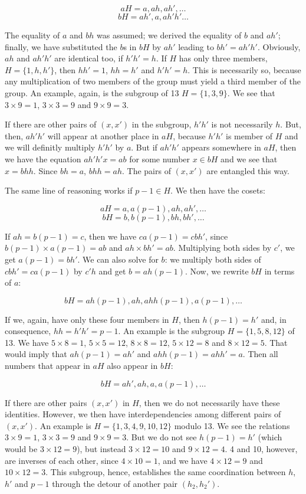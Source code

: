 \documentclass{scrreprt}
\begin{document}
{\[
aH = a, ah, ah', \dots
\]
\[
bH = ah', a, ah'h' \dots
\]

The equality of $a$ and $bh$
was assumed; we derived the equality
of $b$ and $ah'$; finally,
we have substituted the $b$s in $bH$
by $ah'$ leading to $bh' = ah'h'$.
Obviously, $ah$ and $ah'h'$
are identical too, if $h'h' = h$.
If $H$ has only three members,
$H = \lbrace 1, h, h'\rbrace$,
then $hh' = 1$, $hh = h'$
and $h'h' = h$.
This is necessarily so, because
any multiplication of two members
of the group must yield a third
member of the group.
An example, again, is the subgroup of 13
$H = \lbrace 1,3,9\rbrace$.
We see that $3 \times 9 = 1$,
$3 \times 3 = 9$ and $9 \times 9 = 3$.

If there are other pairs of $(x,x')$
in the subgroup, $h'h'$ is not necessarily
$h$. But, then, $ah'h'$ will appear at another place
in $aH$, because $h'h'$ is member of $H$
and we will definitly multiply $h'h'$ by $a$.
But if $ah'h'$ appears somewhere
in $aH$, then we have the equation
$ah'h'x = ab$ for some number $x \in bH$
and we see that $x = bhh$. 
Since $bh = a$, $bhh = ah$. 
The pairs of $(x,x')$ are entangled this way.

The same line of reasoning works 
if $p-1 \in H$. We then have the cosets:

\[
aH = a, a(p-1), ah, ah', \dots
\]
\[
bH = b, b(p-1), bh, bh', \dots
\]

If $ah = b(p-1) = c$, then we have
$ca(p-1) = cbh'$, since 
$b(p-1) \times a(p-1) = ab$ and
$ah \times bh' = ab$. 
Multiplying both sides by $c'$,
we get $a(p-1) = bh'$.
We can also solve for $b$:
we multiply both sides of $cbh' = ca(p-1)$ by $c'h$ and get
$b = ah(p-1)$. Now, we rewrite $bH$ in terms
of $a$:

\[
bH = ah(p-1), ah, ahh(p-1), a(p-1), \dots
\]

If we, again, have only these four members
in $H$, then $h(p-1) = h'$ and, in consequence,
$hh = h'h' = p-1$. An example is the subgroup
$H = \lbrace 1,5,8,12\rbrace$ of 13.
We have $5 \times 8 = 1$, 
$5 \times 5 = 12$, $8 \times 8 = 12$,
$5 \times 12 = 8$ and $8 \times 12 = 5$.
That would imply that
$ah(p-1) = ah'$ and $ahh(p-1) = ahh' = a$.
Then all numbers that appear in $aH$
also appear in $bH$:

\[
bH = ah', ah, a, a(p-1), \dots
\]

If there are other pairs $(x,x')$ in $H$,
then we do not necessarily have these identities.
However, we then have interdependencies
among different pairs of $(x,x')$.
An example is $H = \lbrace 1,3,4,9,10,12\rbrace$
modulo 13.
We see the relations $3 \times 9 = 1$,
$3 \times 3 = 9$ and $9 \times 9 = 3$.
But we do not see $h(p-1) = h'$
(which would be $3 \times 12 = 9$), but instead
$3 \times 12 = 10$ and $9 \times 12 = 4$.
4 and 10, however, are inverses of each other,
since $4 \times 10 = 1$, and we have
$4 \times 12 = 9$ and $10 \times 12 = 3$.
This subgroup, hence, establishes the same
coordination between $h$, $h'$ and $p-1$
through the detour of another pair $(h_2,h_2')$.

}
\end{document}
